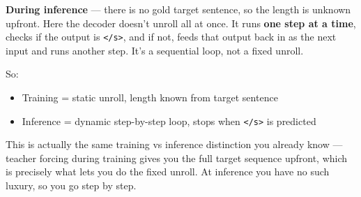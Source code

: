 \textbf{During inference} --- there is no gold target sentence, so the length is unknown upfront. Here the decoder doesn't unroll all at once. It runs \textbf{one step at a time}, checks if the output is \texttt{</s>}, and if not, feeds that output back in as the next input and runs another step. It's a sequential loop, not a fixed unroll.

So:
\begin{itemize}
    \item Training = static unroll, length known from target sentence
    \item Inference = dynamic step-by-step loop, stops when \texttt{</s>} is predicted
\end{itemize}

This is actually the same training vs inference distinction you already know --- teacher forcing during training gives you the full target sequence upfront, which is precisely what lets you do the fixed unroll. At inference you have no such luxury, so you go step by step.